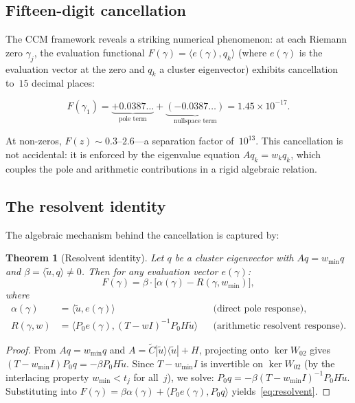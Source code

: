 \documentclass[12pt,a4paper]{article}
\newtheorem{theorem}{Theorem}[section]
\theoremstyle{definition}
\theoremstyle{remark}
\newcommand{\ip}[2]{\langle #1, #2 \rangle}
\newcommand{\utilde}{\tilde{u}}
\newcommand{\Ctilde}{\tilde{C}}
\newcommand{\wmin}{w_{\min}}
\begin{document}
\subsection{Fifteen-digit cancellation}

The CCM framework reveals a striking numerical phenomenon:
at each Riemann zero $\gamma_j$, the evaluation functional $F(\gamma)
= \ip{e(\gamma)}{q_k}$ (where $e(\gamma)$ is the evaluation vector
at the zero and $q_k$ a cluster eigenvector) exhibits cancellation
to~$15$ decimal places:

\begin{equation}
\label{eq:cancel}
F(\gamma_1) = \underbrace{+0.0387\ldots}_{\text{pole term}}
+ \underbrace{(-0.0387\ldots)}_{\text{nullspace term}}
= 1.45 \times 10^{-17}.
\end{equation}

At non-zeros, $F(z) \sim 0.3$--$2.6$---a separation factor of~$10^{13}$.
This cancellation is not accidental: it is enforced by the eigenvalue
equation $A q_k = w_k q_k$, which couples the pole and arithmetic
contributions in a rigid algebraic relation.

\subsection{The resolvent identity}

The algebraic mechanism behind the cancellation is captured by:

\begin{theorem}[Resolvent identity]
\label{thm:resolvent}
Let $q$ be a cluster eigenvector with $A q = \wmin q$ and $\beta = \ip{\utilde}{q} \neq 0$.
Then for any evaluation vector $e(\gamma)$:
\begin{equation}
\label{eq:resolvent}
F(\gamma) = \beta \cdot \bigl[\alpha(\gamma) - R(\gamma, \wmin)\bigr],
\end{equation}
where
\begin{align}
\alpha(\gamma) &= \ip{\utilde}{e(\gamma)}
  && \text{(direct pole response)}, \\
R(\gamma, w) &= \ip{P_0 e(\gamma)}{(T - w I)^{-1} P_0 H \utilde}
  && \text{(arithmetic resolvent response)}.
\end{align}
\end{theorem}

\begin{proof}
From $A q = \wmin q$ and $A = \Ctilde |\utilde\rangle\langle\utilde| + H$,
projecting onto $\ker W_{02}$ gives
$(T - \wmin I) P_0 q = -\beta P_0 H \utilde$.
Since $T - \wmin I$ is invertible on $\ker W_{02}$
(by the interlacing property $\wmin < t_j$ for all~$j$), we solve:
$P_0 q = -\beta (T - \wmin I)^{-1} P_0 H \utilde$.
Substituting into $F(\gamma) = \beta \alpha(\gamma) + \ip{P_0 e(\gamma)}{P_0 q}$
yields~\eqref{eq:resolvent}.
\end{proof}
\end{document}
